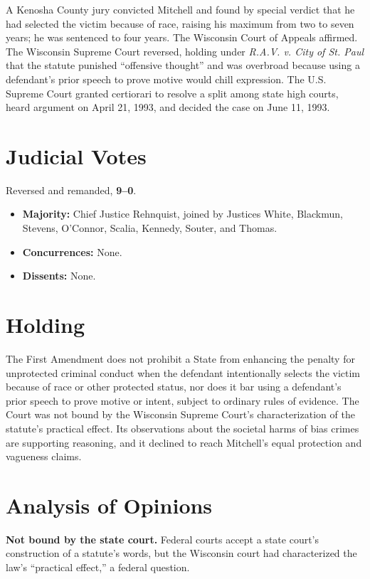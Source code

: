 \documentclass[12pt]{article}
\begin{document}
A Kenosha County jury convicted Mitchell and found by special verdict that he had selected the victim because of race, raising his maximum from two to seven years; he was sentenced to four years. The Wisconsin Court of Appeals affirmed. The Wisconsin Supreme Court reversed, holding under \textit{R.A.V. v. City of St. Paul} that the statute punished ``offensive thought'' and was overbroad because using a defendant's prior speech to prove motive would chill expression. The U.S. Supreme Court granted certiorari to resolve a split among state high courts, heard argument on April 21, 1993, and decided the case on June 11, 1993.

\section{Judicial Votes}

Reversed and remanded, \textbf{9--0}.
\begin{itemize}
\item \textbf{Majority:} Chief Justice Rehnquist, joined by Justices White, Blackmun, Stevens, O'Connor, Scalia, Kennedy, Souter, and Thomas.
\item \textbf{Concurrences:} None.
\item \textbf{Dissents:} None.
\end{itemize}

\section{Holding}

The First Amendment does not prohibit a State from enhancing the penalty for unprotected criminal conduct when the defendant intentionally selects the victim because of race or other protected status, nor does it bar using a defendant's prior speech to prove motive or intent, subject to ordinary rules of evidence. The Court was not bound by the Wisconsin Supreme Court's characterization of the statute's practical effect. Its observations about the societal harms of bias crimes are supporting reasoning, and it declined to reach Mitchell's equal protection and vagueness claims.

\section{Analysis of Opinions}

\textbf{Not bound by the state court.} Federal courts accept a state court's construction of a statute's words, but the Wisconsin court had characterized the law's ``practical effect,'' a federal question.
\end{document}
